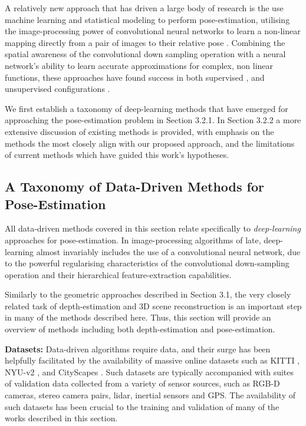 A relatively new approach that has driven a large body of research is the use machine learning and statistical modeling to perform pose-estimation, utilising the image-processing power of convolutional neural networks to learn a non-linear mapping directly from a pair of images to their relative pose \cite{eigen2014supervised, garg2016unsupervised,godard2016consistency, liu2015supervised, zhou2017unsupervised}.  Combining the spatial awareness of the convolutional down sampling operation with a neural network's ability to learn accurate approximations for complex, non linear functions, these approaches have found success in both supervised \cite{liu2015supervised, eigen2014supervised}, and unsupervised configurations \cite{garg2016unsupervised, godard2016consistency, zhou2017unsupervised}. 


We first establish a taxonomy of deep-learning methods that have emerged for approaching the pose-estimation problem in Section 3.2.1. In Section 3.2.2 a more extensive discussion of existing methods is provided, with emphasis on the methods the most closely align with our proposed approach, and the limitations of current methods which have guided this work's hypotheses. 


\subsection{A Taxonomy of Data-Driven Methods for Pose-Estimation}

All data-driven methods covered in this section relate specifically to \textit{deep-learning} approaches for pose-estimation. In image-processing algorithms of late, deep-learning almost invariably includes the use of a convolutional neural network, due to the powerful regularising characteristics of the convolutional down-sampling operation and their hierarchical feature-extraction capabilities. 

Similarly to the geometric approaches described in Section 3.1, the very closely related task of depth-estimation and 3D scene reconstruction is an important step in many of the methods described here. Thus, this section will provide an overview of methods including both depth-estimation and pose-estimation.

\textbf{Datasets: } Data-driven algorithms require data, and their surge has been helpfully facilitated by the availability of massive online datasets such as KITTI \cite{dataset-kitti}, NYU-v2 \cite{dataset-nyuv2}, and CityScapes \cite{dataset-cityscapes}. Such datasets are typically accompanied with suites of validation data collected from a variety of sensor sources, such as RGB-D cameras, stereo camera pairs, lidar, inertial sensors and GPS. The availability of such datasets has been crucial to the training and validation of many of the works described in this section.

